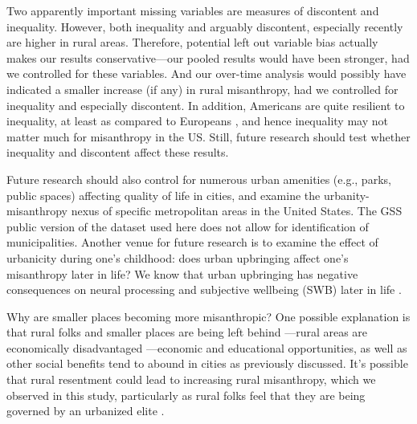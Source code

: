 \documentclass[11pt, letterpaper]{article}
\begin{document}
\begin{spacing}{1.4}
Two apparently important missing variables are measures of discontent and
inequality. However, both inequality \citep[e.g.,][]{daleyMISCNYT20apr14} %
and arguably discontent, especially recently 
\citep[e.g.,][]{case15,hansonCityJournalautumn15,fullerNYT17monD} 
%
 are higher in rural areas. Therefore, potential left out variable bias actually makes our results conservative---our pooled results would have been stronger, had we controlled for these variables. 
 And our over-time analysis would possibly have indicated a smaller increase (if any) in rural misanthropy, had we controlled for inequality and especially discontent.  
 In addition, Americans are quite resilient to inequality, at least as compared to Europeans \citep{alesina04al}, and hence inequality may not matter much for misanthropy in the US.
Still, future research should test whether inequality and discontent affect these results. 

Future research should also control for numerous urban amenities (e.g., parks,
public spaces) affecting quality of life in cities, and examine the
urbanity-misanthropy nexus of specific metropolitan areas in the United
States. The GSS public version of the dataset used here does not allow for
identification of municipalities. Another venue for future research is to examine the effect of urbanicity during one's childhood: does urban upbringing affect one's misanthropy later in life? We know that urban upbringing has negative consequences on neural processing and subjective wellbeing (SWB) later in life \citep{lederbogen11,aok20}. 

Why are smaller places becoming more misanthropic? One possible explanation is that rural folks and smaller places are being left behind \citep{fullerNYT17monD,hansonCityJournalautumn15,aok-misanthropy-trustCity,aok-swbGenYcity18,aokCityBook15}---rural areas are economically disadvantaged \citep{glaeser11,osullivan09,florida21}---economic and educational opportunities, as well as other social benefits tend to abound in cities as previously discussed. It's possible that rural resentment could lead to increasing rural misanthropy, which we observed in this study, particularly as rural folks feel that they are being governed by an urbanized elite \citep{wuthnow18,fullerNYT17monD}. %
  

\end{spacing}
\end{document}
